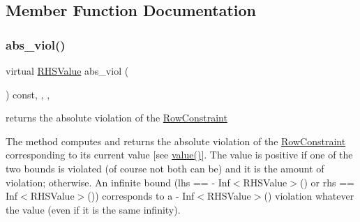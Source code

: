 \subsection{Member Function Documentation}
\mbox{\label{class_s_m_spp__di__unipi__it_1_1_l_b_constraint_a1e06e555eab5078e4d5ec16745778984}} 
\subsubsection{\texorpdfstring{abs\+\_\+viol()}{abs\_viol()}}
{\footnotesize\ttfamily virtual \mbox{\hyperlink{class_s_m_spp__di__unipi__it_1_1_row_constraint_a8813536ab3b13a81c8e83a999ade3bd8}{R\+H\+S\+Value}} abs\+\_\+viol (\begin{DoxyParamCaption}\item[{void}]{ }\end{DoxyParamCaption}) const\hspace{0.3cm}{\ttfamily [inline]}, {\ttfamily [final]}, {\ttfamily [override]}, {\ttfamily [virtual]}}



returns the absolute violation of the \mbox{\hyperlink{class_s_m_spp__di__unipi__it_1_1_row_constraint}{Row\+Constraint}} 

The method computes and returns the absolute violation of the \mbox{\hyperlink{class_s_m_spp__di__unipi__it_1_1_row_constraint}{Row\+Constraint}} corresponding to its current value \mbox{[}see \mbox{\hyperlink{class_s_m_spp__di__unipi__it_1_1_one_var_constraint_ad9256be16b98f3b557f54fa5e2118db7}{value()}}\mbox{]}. The value is positive if one of the two bounds is violated (of course not both can be) and it is the amount of violation; otherwise. An infinite bound (lhs == -\/ Inf$<$\+R\+H\+S\+Value$>$() or rhs == Inf$<$\+R\+H\+S\+Value$>$()) corresponds to a -\/ Inf$<$\+R\+H\+S\+Value$>$() violation whatever the value (even if it is the same infinity).

